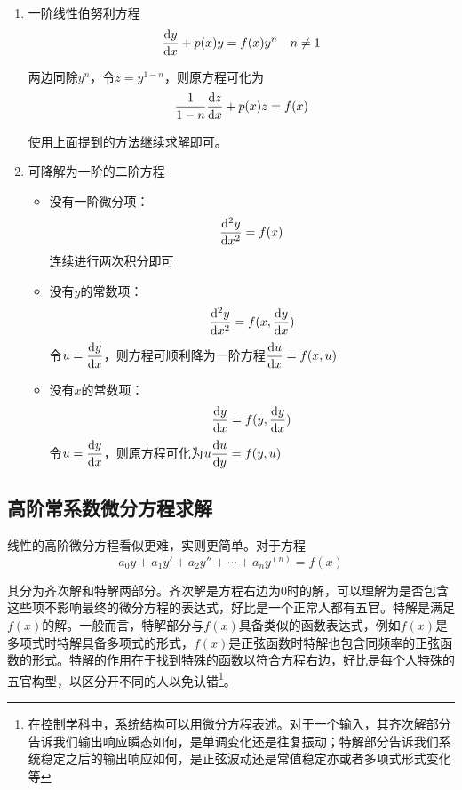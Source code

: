\begin{enumerate}
    代回之前的微分方程，有：
    \[u'e^{-\int p(x)\dif x} + u e^{-\int p(x)\dif x}(-p(x)) + p(x) u e^{-\int p(x)\dif x} = f(x)\]

    可解得：
    \[u = \int f(x) e^{\int p(x)\dif x}\dif x\]

    因此其完整的解为：
    \[y = \left[\int f(x) e^{\int p(x)\dif x}\dif x + C\right] e^{-\int p(x)\dif x}\]

    \item 一阶线性伯努利方程
    \[\dfrac{\dif{y}}{\dif{x}} + p(x)y = f(x)y^{n}\quad n\neq 1\]

    两边同除$y^n$，令$z=y^{1-n}$，则原方程可化为
    \[\dfrac{1}{1-n}\dfrac{\dif{z}}{\dif{x}} + p(x)z = f(x)\]
    
    使用上面提到的方法继续求解即可。
    \item 可降解为一阶的二阶方程
    \begin{itemize}
        \item 没有一阶微分项：
        \[\dfrac{\dif^2{y}}{\dif{x^2}}=f(x)\]
        连续进行两次积分即可
        \item 没有$y$的常数项：
        \[\dfrac{\dif^2{y}}{\dif{x^2}}=f(x,\dfrac{\dif{y}}{\dif{x}})\]
        令$u=\dfrac{\dif{y}}{\dif{x}}$，则方程可顺利降为一阶方程$\dfrac{\dif{u}}{\dif{x}}=f(x,u)$
        \item 没有$x$的常数项：
        \[\dfrac{\dif{y}}{\dif{x}}=f(y,\dfrac{\dif{y}}{\dif{x}})\]
        令$u=\dfrac{\dif{y}}{\dif{x}}$，则原方程可化为$u\dfrac{\dif{u}}{\dif{y}}=f(y,u)$
    \end{itemize}
\end{enumerate}

\subsection[高阶常系数微分方程求解]{高阶常系数微分方程求解}
线性的高阶微分方程看似更难，实则更简单。对于方程
\[a_0 y + a_1 y' + a_2 y'' + \cdots + a_n y^{(n)} = f(x)\]

其分为齐次解和特解两部分。齐次解是方程右边为0时的解，可以理解为是否包含这些项不影响最终的微分方程的表达式，好比是一个正常人都有五官。特解是满足$f(x)$的解。一般而言，特解部分与$f(x)$具备类似的函数表达式，例如$f(x)$是多项式时特解具备多项式的形式，$f(x)$是正弦函数时特解也包含同频率的正弦函数的形式。特解的作用在于找到特殊的函数以符合方程右边，好比是每个人特殊的五官构型，以区分开不同的人以免认错\footnote{在控制学科中，系统结构可以用微分方程表述。对于一个输入，其齐次解部分告诉我们输出响应瞬态如何，是单调变化还是往复振动；特解部分告诉我们系统稳定之后的输出响应如何，是正弦波动还是常值稳定亦或者多项式形式变化等}。

